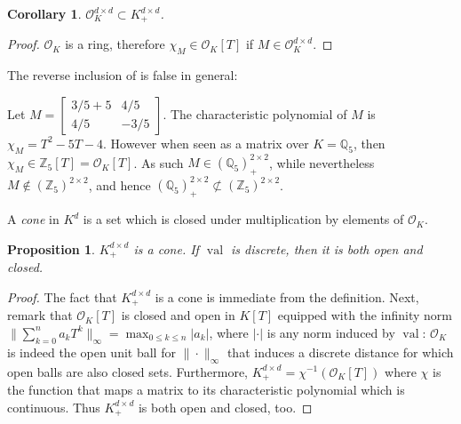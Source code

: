\documentclass{elsarticle}
\theoremstyle{plain}
\newtheorem{proposition}[theorem]{Proposition}
\newtheorem{corollary}[theorem]{Corollary}
\theoremstyle{definition}
\DeclareMathOperator{\val}{val}
\newcommand{\OK}{\mathcal{O}_K}
\begin{document}
\begin{corollary}\label{cor_caracsdp}
  $\OK^{d\times d} \subset K^{d\times d}_+$.
\end{corollary}
\begin{proof}
  $\OK$ is a ring, therefore $\chi_M \in \OK[T]$ if $M \in \OK^{d \times d}$.
\end{proof}
The reverse inclusion of  is false in general:
\begin{example}
  Let
  $
  M = \left[\begin{smallmatrix} {3}/{5}+5 & {4}/{5} \\ {4}/{5} & -{3}/{5} \end{smallmatrix}\right].
  $
  The characteristic polynomial of $M$
  is $\chi_M = T^2-5T-4$. However when seen as a matrix over $K=\mathbb{Q}_5$, then $\chi_M \in \mathbb{Z}_5[T] = \OK[T]$. As such $M \in (\mathbb{Q}_5)^{2 \times 2}_+$, while nevertheless $M \not\in (\mathbb{Z}_5)^{2\times 2}$, and hence
  $(\mathbb{Q}_5)^{2 \times 2}_+ \not\subset (\mathbb{Z}_5)^{2 \times 2}$. 
\end{example}

\begin{definition}
  A \emph{cone} in $K^d$ is a set which is closed under multiplication by elements of $\OK$.
\end{definition}

\begin{proposition}
  $K^{d \times d}_+$ is a cone.
  If $\val$ is discrete, then it is both open and closed.
\end{proposition}
\begin{proof}
  The fact that $K^{d \times d}_+$ is a cone is immediate from the definition.
  Next, remark that $\OK[T]$ is closed and open in $K[T]$ equipped with the infinity norm
  $\| \sum_{k=0}^{n} a_k T^k \|_\infty = \max_{0 \leq k \leq n} |a_k|$,
  {where $|\cdot|$ is any norm induced by $\val$}:
  $\OK$ is indeed the open unit ball for $\|\cdot \|_\infty$ that induces a discrete distance for
  which open balls are also closed sets.
  Furthermore, $K^{d\times d}_+ = \chi^{-1}(\OK[T]) $ where $\chi$ is the function that maps a
  matrix to its characteristic polynomial which is continuous.
  Thus $K^{d\times d}_+$ is both open and closed, too.
\end{proof}
\end{document}

